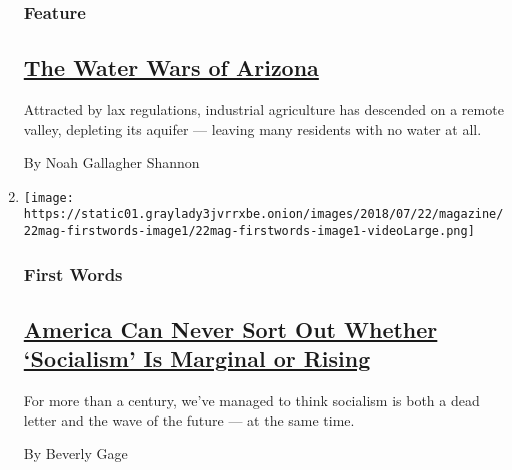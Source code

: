 \begin{enumerate}
  \hypertarget{feature-2}{%
  \subsubsection{Feature}\label{feature-2}}

  \hypertarget{the-water-wars-of-arizona}{%
  \subsection{\texorpdfstring{\href{/2018/07/19/magazine/the-water-wars-of-arizona.html}{The
  Water Wars of
  Arizona}}{The Water Wars of Arizona}}\label{the-water-wars-of-arizona}}

  Attracted by lax regulations, industrial agriculture has descended on
  a remote valley, depleting its aquifer --- leaving many residents with
  no water at all.

  By Noah Gallagher Shannon
\item
  \texttt{[image: https://static01.graylady3jvrrxbe.onion/images/2018/07/22/magazine/22mag-firstwords-image1/22mag-firstwords-image1-videoLarge.png]}

  \hypertarget{first-words}{%
  \subsubsection{First Words}\label{first-words}}

  \hypertarget{america-can-never-sort-out-whether-socialism-is-marginal-or-rising}{%
  \subsection{\texorpdfstring{\href{/2018/07/17/magazine/america-can-never-sort-out-whether-socialism-is-marginal-or-rising.html}{America
  Can Never Sort Out Whether `Socialism' Is Marginal or
  Rising}}{America Can Never Sort Out Whether `Socialism' Is Marginal or Rising}}\label{america-can-never-sort-out-whether-socialism-is-marginal-or-rising}}

  For more than a century, we've managed to think socialism is both a
  dead letter and the wave of the future --- at the same time.

  By Beverly Gage
\end{enumerate}

